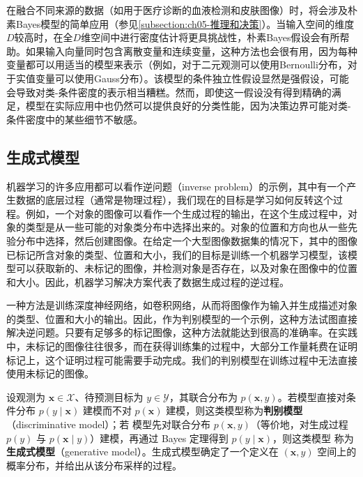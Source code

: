 \documentclass[../../main.tex]{subfiles}
\begin{document}
在融合不同来源的数据（如用于医疗诊断的血液检测和皮肤图像）时，将会涉及朴素Bayes模型的简单应用（参见\cref{subsection:ch05-推理和决策}）。当输入空间的维度$D$较高时，在全$D$维空间中进行密度估计将更具挑战性，朴素Bayes假设会有所帮助。如果输入向量同时包含离散变量和连续变量，这种方法也会很有用，因为每种变量都可以用适当的模型来表示（例如，对于二元观测可以使用Bernoulli分布，对于实值变量可以使用Gauss分布）。该模型的条件独立性假设显然是强假设，可能会导致对类-条件密度的表示相当糟糕。然而，即使这一假设没有得到精确的满足，模型在实际应用中也仍然可以提供良好的分类性能，因为决策边界可能对类-条件密度中的某些细节不敏感。

\subsection{生成式模型}\label{subsection:ch11-生成式模型}

机器学习的许多应用都可以看作逆问题（inverse problem）的示例，其中有一个产生数据的底层过程（通常是物理过程），我们现在的目标是学习如何反转这个过程。例如，一个对象的图像可以看作一个生成过程的输出，在这个生成过程中，对象的类型是从一些可能的对象类分布中选择出来的。对象的位置和方向也从一些先验分布中选择，然后创建图像。在给定一个大型图像数据集的情况下，其中的图像已标记所含对象的类型、位置和大小，我们的目标是训练一个机器学习模型，该模型可以获取新的、未标记的图像，并检测对象是否存在，以及对象在图像中的位置和大小。因此，机器学习解决方案代表了数据生成过程的逆过程。

一种方法是训练深度神经网络，如卷积网络，从而将图像作为输入并生成描述对象的类型、位置和大小的输出。因此，作为判别模型的一个示例，这种方法试图直接解决逆问题。只要有足够多的标记图像，这种方法就能达到很高的准确率。在实践中，未标记的图像往往很多，而在获得训练集的过程中，大部分工作量耗费在证明标记上，这个证明过程可能需要手动完成。我们的判别模型在训练过程中无法直接使用未标记的图像。

\begin{definition}[判别模型与生成式模型]\label{definition:ch11-生成式模型}
设观测为 $\mathbf{x}\in\mathcal{X}$、待预测目标为 $y\in\mathcal{Y}$，其联合分布为
$p(\mathbf{x},y)$。若模型直接对条件分布 $p(y\mid\mathbf{x})$ 建模而不对
$p(\mathbf{x})$ 建模，则这类模型称为\textbf{判别模型}（discriminative model）；若
模型先对联合分布 $p(\mathbf{x},y)$（等价地，对生成过程 $p(y)$ 与
$p(\mathbf{x}\mid y)$）建模，再通过 Bayes 定理得到 $p(y\mid\mathbf{x})$，则这类模型
称为\textbf{生成式模型}（generative model）。生成式模型确定了一个定义在
$(\mathbf{x},y)$ 空间上的概率分布，并给出从该分布采样的过程。
\end{definition}
\end{document}
